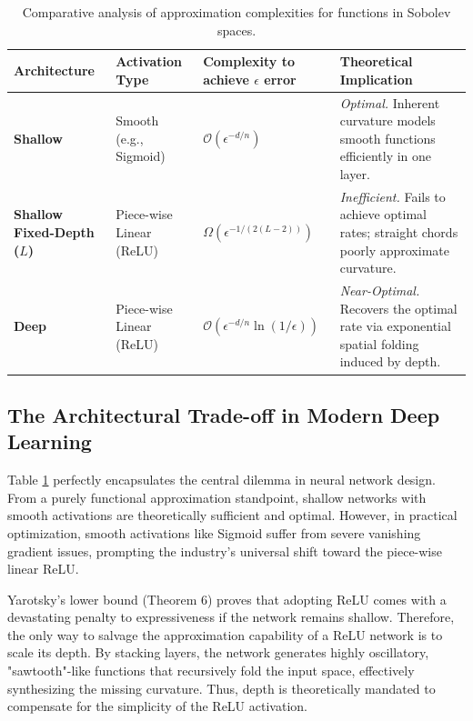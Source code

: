 \documentclass[12pt]{article}
\begin{document}
\begin{table}[htbp]
\centering
\renewcommand{\arraystretch}{1.5}
\begin{tabular}{|p{}|p{}|p{}|p{}|}
\hline
\textbf{Architecture} & \textbf{Activation Type} & \textbf{Complexity to achieve $\epsilon$ error} & \textbf{Theoretical Implication} \\ \hline
\textbf{Shallow} & Smooth (e.g., Sigmoid) & $\mathcal{O}(\epsilon^{-d/n})$ & \textit{Optimal.} Inherent curvature models smooth functions efficiently in one layer. \\ \hline
\textbf{Shallow Fixed-Depth ($L$)} & Piece-wise Linear (ReLU) & $\Omega(\epsilon^{-1/(2(L-2))})$ & \textit{Inefficient.} Fails to achieve optimal rates; straight chords poorly approximate curvature. \\ \hline
\textbf{Deep} & Piece-wise Linear (ReLU) & $\mathcal{O}(\epsilon^{-d/n} \ln(1/\epsilon))$ & \textit{Near-Optimal.} Recovers the optimal rate via exponential spatial folding induced by depth. \\ \hline
\end{tabular}
\caption{Comparative analysis of approximation complexities for functions in Sobolev spaces.}
\label{tab:complexity_comparison}
\end{table}

\subsection{The Architectural Trade-off in Modern Deep Learning}
Table \ref{tab:complexity_comparison} perfectly encapsulates the central dilemma in neural network design. From a purely functional approximation standpoint, shallow networks with smooth activations are theoretically sufficient and optimal. However, in practical optimization, smooth activations like Sigmoid suffer from severe vanishing gradient issues, prompting the industry's universal shift toward the piece-wise linear ReLU.

Yarotsky's lower bound (Theorem 6) proves that adopting ReLU comes with a devastating penalty to expressiveness if the network remains shallow. Therefore, the only way to salvage the approximation capability of a ReLU network is to scale its depth. By stacking layers, the network generates highly oscillatory, "sawtooth"-like functions that recursively fold the input space, effectively synthesizing the missing curvature. Thus, depth is theoretically mandated to compensate for the simplicity of the ReLU activation.
\end{document}
